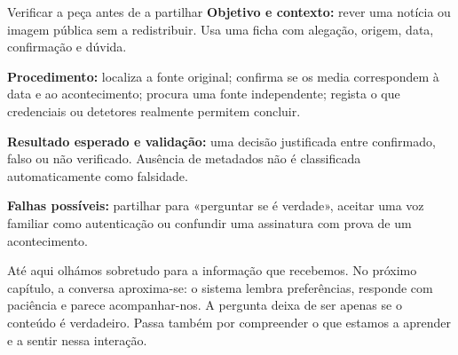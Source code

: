 \begin{promptlabbox}{Verificar a peça antes de a partilhar}
\textbf{Objetivo e contexto:} rever uma notícia ou imagem pública sem a redistribuir. Usa uma ficha com alegação, origem, data, confirmação e dúvida.

\textbf{Procedimento:} localiza a fonte original; confirma se os media correspondem à data e ao acontecimento; procura uma fonte independente; regista o que credenciais ou detetores realmente permitem concluir.

\textbf{Resultado esperado e validação:} uma decisão justificada entre confirmado, falso ou não verificado. Ausência de metadados não é classificada automaticamente como falsidade.

\textbf{Falhas possíveis:} partilhar para «perguntar se é verdade», aceitar uma voz familiar como autenticação ou confundir uma assinatura com prova de um acontecimento.
\end{promptlabbox}

Até aqui olhámos sobretudo para a informação que recebemos. No próximo capítulo, a conversa aproxima-se: o sistema lembra preferências, responde com paciência e parece acompanhar-nos. A pergunta deixa de ser apenas se o conteúdo é verdadeiro. Passa também por compreender o que estamos a aprender e a sentir nessa interação.

